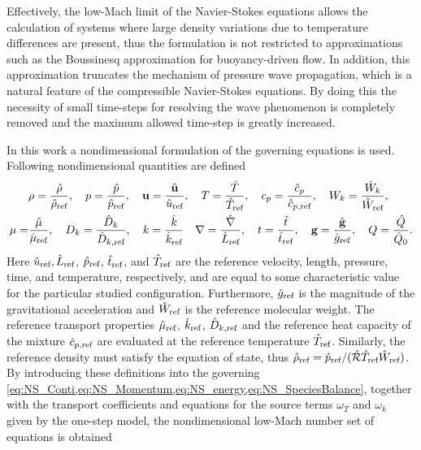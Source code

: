 Effectively, the low-Mach limit of the Navier-Stokes equations allows the calculation of systems where large density variations due to temperature differences are present, thus the formulation is not restricted to approximations such as the Boussinesq approximation for buoyancy-driven flow. In addition, this approximation truncates the mechanism of pressure wave propagation, which is a natural feature of the compressible Navier-Stokes equations. By doing this the necessity of small time-steps for resolving the wave phenomenon is completely removed and the maximum allowed time-step is greatly increased.

In this work a nondimensional formulation of the governing equations is used. Following nondimensional quantities are defined
\begin{align*}
	      & \rho = \frac{\hat \rho}{\hat \rho_{\text{ref}}}, \quad
	p = \frac{\hat p}{\hat p_{\text{ref}}}, \quad
	\textbf{u}= \frac{\hat{\textbf{u}}}{\hat u_{\text{ref}}}, \quad
	T = \frac{\hat T}{\hat T_{\text{ref}}},  \quad
	c_p = \frac{\hat c_p}{\hat c_{p,\text{ref}}}, \quad
	W_k = \frac{\hat{W}_k}{\hat W_{\text{ref}}},
	\\
	\mu = & \frac{\hat \mu}{\hat \mu_{\text{ref}}},\quad
	D_k = \frac{\hat D_k}{\hat D_{k,\text{ref}}}, \quad
	k = \frac{\hat k}{\hat k_{\text{ref}}}\quad
	\nabla = \frac{\hat \nabla}{\hat L_{\text{ref}}}, \quad
	t = \frac{\hat{t}}{\hat t_{\text{ref}}},\quad
	\textbf{g} = \frac{\hat{\textbf{g}}}{\hat g_{\text{ref}}},\quad
	Q = \frac{\hat Q}{\hat{Q}_0}.
\end{align*}
Here $\hat u_{\text{ref}}, \hat L_{\text{ref}}$, $\hat p_{\text{ref}}$, $\hat t_{\text{ref}}$, and $\hat T_{\text{ref}}$ are the reference velocity, length, pressure, time, and temperature, respectively, and are equal to some characteristic value for the particular studied configuration. Furthermore, $\hat g_{\text{ref}}$ is the magnitude of the gravitational acceleration and $\hat W_{\text{ref}}$ is the reference molecular weight. The reference transport properties $\hat \mu_{\text{ref}}$, $\hat k_{\text{ref}}$, $\hat D_{k,\text{ref}}$ and the reference heat capacity of the mixture $\hat c_{p,\text{ref}}$ are evaluated at the reference temperature $\hat T_{\text{ref}}$. Similarly, the reference density must satisfy the equation of state, thus $\hat \rho_{\text{ref}} = \hat p_{\text{ref}}/(\hat{\mathcal{R}}\hat T_{\text{ref}}\hat W_{\text{ref}})$.  By introducing these definitions into the governing  \cref{eq:NS_Conti,eq:NS_Momentum,eq:NS_energy,eq:NS_SpeciesBalance}, together with the transport coefficients and equations for the source terms $\omega_T$ and $\omega_k$ given by the one-step model, the nondimensional low-Mach number set of equations is obtained
